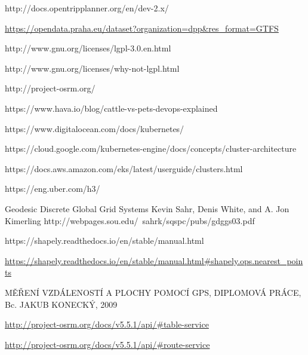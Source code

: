 \documentclass[thesis=M,czech]{FITthesis}[2019/12/23]
\theoremstyle{plain}
\theoremstyle{definition}
\begin{document}
\begin{thebibliography}{9}


http://docs.opentripplanner.org/en/dev-2.x/




\url{https://opendata.praha.eu/dataset?organization=dpp&res_format=GTFS}



http://www.gnu.org/licenses/lgpl-3.0.en.html



http://www.gnu.org/licenses/why-not-lgpl.html


http://project-osrm.org/


https://www.hava.io/blog/cattle-vs-pets-devops-explained



https://www.digitalocean.com/docs/kubernetes/


https://cloud.google.com/kubernetes-engine/docs/concepts/cluster-architecture


https://docs.aws.amazon.com/eks/latest/userguide/clusters.html



https://eng.uber.com/h3/



Geodesic Discrete Global Grid Systems
Kevin Sahr, Denis White, and A. Jon Kimerling
http://webpages.sou.edu/~sahrk/sqspc/pubs/gdggs03.pdf


https://shapely.readthedocs.io/en/stable/manual.html




\url{https://shapely.readthedocs.io/en/stable/manual.html#shapely.ops.nearest_points}


MĚŘENÍ VZDÁLENOSTÍ A PLOCHY POMOCÍ GPS, DIPLOMOVÁ PRÁCE,  Bc. JAKUB KONECKÝ, 2009



\url{http://project-osrm.org/docs/v5.5.1/api/#table-service}


\url{http://project-osrm.org/docs/v5.5.1/api/#route-service}




\end{thebibliography}
\end{document}
